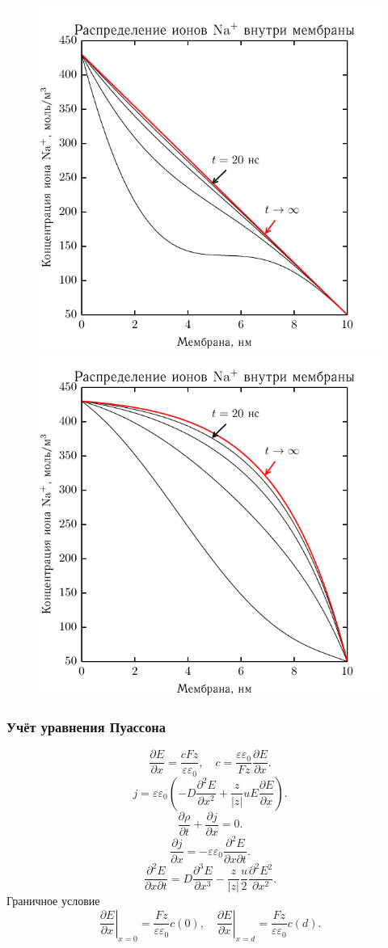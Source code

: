 \documentclass[10pt,pdf]{beamer}
\newcommand{\pder}[2] {\frac{\partial #1}{\partial #2}}
\newcommand{\ppder}[2]{\frac{\partial^2 #1}{\partial {#2}^2}}
\newcommand{\pcder}[3]{\frac{\partial^2 #1}{\partial #2 \partial #3}}
\newcommand{\abs}[1]{\left| #1 \right|}
\newcommand{\eps}{\varepsilon}
\begin{document}
\begin{frame}
    \begin{figure}[H]
    \begin{center}
        \includegraphics[width=.47\textwidth]{../plots/linear_conc}
    \hfill
        \includegraphics[width=.47\textwidth]{../plots/linear_field}
    \end{center}
    \end{figure}


  \end{frame}
  \begin{frame}
      \frametitle{Учёт уравнения Пуассона}
      \begin{equation}
        \pder{E}{x} = \frac{cFz}{\eps\eps_0},\quad
        c = \frac{\eps\eps_0}{Fz}\pder{E}{x}.
    \end{equation}
    \begin{equation}
        j = \eps\eps_0
            \left(-D\ppder{E}{x}+\frac{z}{|z|}uE\pder{E}{x}\right).
        \label{eq:j_from_E}
    \end{equation}
    \begin{equation}
        \pder{\rho}{t} + \pder{j}{x} = 0.
    \end{equation}
    \begin{equation}
        \pder{j}{x} = -\eps\eps_0\pcder{E}{x}{t}.
        \label{eq:displacement-current}
    \end{equation}
    \begin{equation}
        \pcder{E}{x}{t} = D\frac{\partial^3{E}}{\partial x^3} -
        \frac{z}{\abs{z}}\frac{u}{2}\ppder{E^2}{x}.
        \label{eq:epic-equation}
    \end{equation}
    Граничное условие
    \begin{equation}
        \left.\pder{E}{x}\right|_{x=0} = \frac{Fz}{\eps\eps_0}c(0),\quad
        \left.\pder{E}{x}\right|_{x=d} = \frac{Fz}{\eps\eps_0}c(d).
    \end{equation}
    \end{frame}
\end{document}
